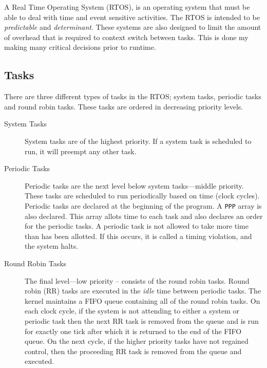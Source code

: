A Real Time Operating System (RTOS), is an operating system that must be able to
deal with time and event sensitive activities. The RTOS is intended
to be \textit{predictable} and \textit{determinant}\cite{RTOSMantis}. These
systems are also designed to limit the amount of overhead that is required to
context switch between tasks. This is done my making many critical decisions
prior to runtime.

\subsection{Tasks}

There are three different types of tasks in the RTOS; system tasks, periodic tasks and round robin tasks. These tasks are ordered in decreasing priority levels.

\begin{description}
    \item[System Tasks]
    System tasks are of the highest priority. If a system task is
    scheduled to run, it will preempt any other task.

    \item[Periodic Tasks]
    Periodic tasks are the next level below system tasks---middle priority.
    These tasks are scheduled to run periodically based on time (clock cycles).
    Periodic tasks are declared at the beginning of the program. A \texttt{PPP}
    array is also declared. This array allots time to each task and also
    declares an order for the periodic tasks. A periodic task is not allowed to
    take more time than has been allotted.  If this occurs, it is called a
    timing violation, and the system halts.

    \item[Round Robin Tasks]
    The final level---low priority -- consists of the round robin tasks. Round robin (RR) tasks
    are executed in the \textit{idle} time between periodic tasks.  The kernel
    maintains a FIFO queue containing all of the round robin tasks. On each clock
    cycle, if the system is not attending to either a system or periodic task then
    the next RR task is removed from the queue and is run for exactly one tick
    after which it is returned to the end of the FIFO queue. On the next cycle, if
    the higher priority tasks have not regained control, then the proceeding RR
    task is removed from the queue and executed.  
\end{description}




